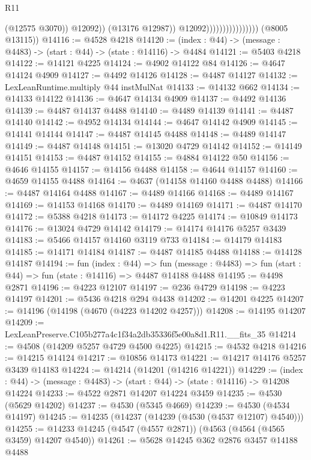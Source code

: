 \begin{lexlean}{R11}
\begin{coremodule}
                                              (@12575 @3070))
                                            @12092))
                                        (@13176 @12987))
                                      @12092))))))))))))))))
      (@8005 @13115))
@14116 := @4528 @4218
@14120 := (index : @44) -> (message : @4483) -> (start : @44) -> (state : @14116) -> @4484
@14121 := @5403 @4218
@14122 := @14121 @4225
@14124 := @4902 @14122 @84
@14126 := @4647 @14124 @4909
@14127 := @4492 @14126
@14128 := @4487 @14127
@14132 := LexLeanRuntime.multiply @44 instMulNat
@14133 := @14132 @662
@14134 := @14133 @14122
@14136 := @4647 @14134 @4909
@14137 := @4492 @14136
@14139 := @4487 @14137 @4488
@14140 := @4489 @14139
@14141 := @4487 @14140
@14142 := @4952 @14134
@14144 := @4647 @14142 @4909
@14145 := @14141 @14144
@14147 := @4487 @14145 @4488
@14148 := @4489 @14147
@14149 := @4487 @14148
@14151 := @13020 @4729 @14142
@14152 := @14149 @14151
@14153 := @4487 @14152
@14155 := @4884 @14122 @50
@14156 := @4646 @14155
@14157 := @14156 @4488
@14158 := @4644 @14157
@14160 := @4659 @14155 @4488
@14164 := @4637 (@14158 @14160 @4488 @4488)
@14166 := @4487 @14164 @4488
@14167 := @4489 @14166
@14168 := @4489 @14167
@14169 := @14153 @14168
@14170 := @4489 @14169
@14171 := @4487 @14170
@14172 := @5388 @4218
@14173 := @14172 @4225
@14174 := @10849 @14173
@14176 := @13024 @4729 @14142
@14179 := @14174 @14176 @5257 @3439
@14183 := @5466 @14157 @14160 @3119 @733
@14184 := @14179 @14183
@14185 := @14171 @14184
@14187 := @4487 @14185 @4488
@14188 := @14128 @14187
@14194 := fun (index : @44) =>
  fun (message : @4483) => fun (start : @44) => fun (state : @14116) => @4487 @14188 @4488
@14195 := @4498 @2871
@14196 := @4223 @12107
@14197 := @236 @4729
@14198 := @4223 @14197
@14201 := @5436 @4218 @294 @4438
@14202 := @14201 @4225
@14207 := @14196 (@14198 (@4670 (@4223 @14202 @4257)))
@14208 := @14195 @14207
@14209 := LexLeanPreserve.C105b277a4c1f34a2db35336f5e00a8d1.R11.__fits_35
@14214 := @4508 (@14209 @5257 @4729 @4500 @4225)
@14215 := @4532 @4218
@14216 := @14215 @14124
@14217 := @10856 @14173
@14221 := @14217 @14176 @5257 @3439 @14183
@14224 := @14214 (@14201 (@14216 @14221))
@14229 := (index : @44) -> (message : @4483) -> (start : @44) -> (state : @14116) -> @14208 @14224
@14233 := @4522 @2871 @14207 @14224 @3459
@14235 := @4530 (@5629 @14202)
@14237 := @4530 (@5345 @4669)
@14239 := @4530 (@4534 @14197)
@14245 := @14235 (@14237 (@14239 (@4530 (@4537 @12107) @4540)))
@14255 := @14233 @14245 (@4547 (@4557 @2871)) (@4563 (@4564 (@4565 @3459) @14207 @4540))
@14261 := @5628 @14245 @362 @2876 @3457 @14188 @4488

\end{coremodule}
\end{lexlean}
